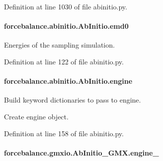 Definition at line 1030 of file abinitio.\-py.

\hypertarget{classforcebalance_1_1abinitio_1_1AbInitio_af928d333d14cb3b93f7db78530455873}{
\paragraph[{emd0}]{\setlength{\rightskip}{0pt plus 5cm}forcebalance.\-abinitio.\-Ab\-Initio.\-emd0\hspace{0.3cm}{\ttfamily [inherited]}}}\label{classforcebalance_1_1abinitio_1_1AbInitio_af928d333d14cb3b93f7db78530455873}


Energies of the sampling simulation. 



Definition at line 122 of file abinitio.\-py.

\hypertarget{classforcebalance_1_1abinitio_1_1AbInitio_a34058fdf49b7b3b8f1fea78dd30f3209}{
\paragraph[{engine}]{\setlength{\rightskip}{0pt plus 5cm}forcebalance.\-abinitio.\-Ab\-Initio.\-engine\hspace{0.3cm}{\ttfamily [inherited]}}}\label{classforcebalance_1_1abinitio_1_1AbInitio_a34058fdf49b7b3b8f1fea78dd30f3209}


Build keyword dictionaries to pass to engine. 

Create engine object. 

Definition at line 158 of file abinitio.\-py.

\hypertarget{classforcebalance_1_1gmxio_1_1AbInitio__GMX_a5c8930da5aa8b01df62d7433da588f82}{
\paragraph[{engine\-\_\-}]{\setlength{\rightskip}{0pt plus 5cm}forcebalance.\-gmxio.\-Ab\-Initio\-\_\-\-G\-M\-X.\-engine\-\_\-}}\label{classforcebalance_1_1gmxio_1_1AbInitio__GMX_a5c8930da5aa8b01df62d7433da588f82}



